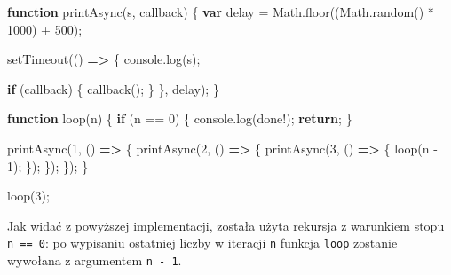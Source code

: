 \documentclass[11pt]{article}
\newenvironment{Shaded}{}{}
\newcommand{\KeywordTok}[1]{\textcolor[rgb]{0.00,0.44,0.13}{\textbf{{#1}}}}
\newcommand{\DecValTok}[1]{\textcolor[rgb]{0.25,0.63,0.44}{{#1}}}
\newcommand{\StringTok}[1]{\textcolor[rgb]{0.25,0.44,0.63}{{#1}}}
\newcommand{\FunctionTok}[1]{\textcolor[rgb]{0.02,0.16,0.49}{{#1}}}
\newcommand{\NormalTok}[1]{{#1}}
\newcommand{\ControlFlowTok}[1]{\textcolor[rgb]{0.00,0.44,0.13}{\textbf{{#1}}}}
\newcommand{\OperatorTok}[1]{\textcolor[rgb]{0.40,0.40,0.40}{{#1}}}
\newcommand{\BuiltInTok}[1]{{#1}}
\newcommand{\PreprocessorTok}[1]{\textcolor[rgb]{0.74,0.48,0.00}{{#1}}}
\begin{document}
\begin{Shaded}
\begin{Highlighting}[]
\KeywordTok{function} \FunctionTok{printAsync}\NormalTok{(s}\OperatorTok{,}\NormalTok{ callback) \{}
    \KeywordTok{var}\NormalTok{ delay }\OperatorTok{=} \BuiltInTok{Math}\OperatorTok{.}\FunctionTok{floor}\NormalTok{((}\BuiltInTok{Math}\OperatorTok{.}\FunctionTok{random}\NormalTok{() }\OperatorTok{*} \DecValTok{1000}\NormalTok{) }\OperatorTok{+} \DecValTok{500}\NormalTok{)}\OperatorTok{;}

    \PreprocessorTok{setTimeout}\NormalTok{(() }\KeywordTok{=\textgreater{}}\NormalTok{ \{}
        \BuiltInTok{console}\OperatorTok{.}\FunctionTok{log}\NormalTok{(s)}\OperatorTok{;}

        \ControlFlowTok{if}\NormalTok{ (callback) \{}
            \FunctionTok{callback}\NormalTok{()}\OperatorTok{;}
\NormalTok{        \}}
\NormalTok{    \}}\OperatorTok{,}\NormalTok{ delay)}\OperatorTok{;}
\NormalTok{\}}

\KeywordTok{function} \FunctionTok{loop}\NormalTok{(n) \{}
    \ControlFlowTok{if}\NormalTok{ (n }\OperatorTok{==} \DecValTok{0}\NormalTok{) \{}
        \BuiltInTok{console}\OperatorTok{.}\FunctionTok{log}\NormalTok{(}\StringTok{\textquotesingle{}done!\textquotesingle{}}\NormalTok{)}\OperatorTok{;}
        \ControlFlowTok{return}\OperatorTok{;}
\NormalTok{    \}}

    \FunctionTok{printAsync}\NormalTok{(}\DecValTok{1}\OperatorTok{,}\NormalTok{ () }\KeywordTok{=\textgreater{}}\NormalTok{ \{}
        \FunctionTok{printAsync}\NormalTok{(}\DecValTok{2}\OperatorTok{,}\NormalTok{ () }\KeywordTok{=\textgreater{}}\NormalTok{ \{}
            \FunctionTok{printAsync}\NormalTok{(}\DecValTok{3}\OperatorTok{,}\NormalTok{ () }\KeywordTok{=\textgreater{}}\NormalTok{ \{}
                \FunctionTok{loop}\NormalTok{(n }\OperatorTok{{-}} \DecValTok{1}\NormalTok{)}\OperatorTok{;}
\NormalTok{            \})}\OperatorTok{;}
\NormalTok{        \})}\OperatorTok{;}
\NormalTok{    \})}\OperatorTok{;}
\NormalTok{\}}

\FunctionTok{loop}\NormalTok{(}\DecValTok{3}\NormalTok{)}\OperatorTok{;}
\end{Highlighting}
\end{Shaded}

Jak widać z powyższej implementacji, została użyta rekursja z warunkiem
stopu \texttt{n\ ==\ 0}: po wypisaniu ostatniej liczby w iteracji
\texttt{n} funkcja \texttt{loop} zostanie wywołana z argumentem
\texttt{n\ -\ 1}.
\end{document}
